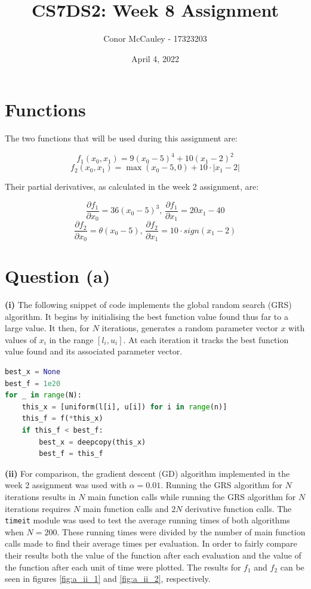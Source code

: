 \documentclass[12pt]{article}
\title{CS7DS2: Week 8 Assignment}
\author{Conor McCauley - 17323203}
\date{April 4, 2022}
\begin{document}
\maketitle

\section*{Functions}

The two functions that will be used during this assignment are:

$$f_1(x_0, x_1) = 9 (x_0 - 5)^4 + 10 (x_1 - 2)^2$$
$$f_2(x_0, x_1) = \max(x_0 - 5, 0) + 10 \cdot |x_1 - 2|$$

Their partial derivatives, as calculated in the week 2 assignment, are:

$$\frac{\partial f_1}{\partial x_0} = 36 (x_0 - 5)^3,\, \frac{\partial f_1}{\partial x_1} = 20x_1 - 40$$
$$\frac{\partial f_2}{\partial x_0} = \theta(x_0 - 5),\, \frac{\partial f_2}{\partial x_1} = 10\cdot sign(x_1 - 2)$$

\section*{Question (a)}

\noindent \textbf{(i)} The following snippet of code implements the global random search (GRS) algorithm. It begins by initialising the best function value found thus far to a large value. It then, for $N$ iterations, generates a random parameter vector $x$ with values of $x_i$ in the range $[l_i, u_i]$. At each iteration it tracks the best function value found and its associated parameter vector.

\lstset{basicstyle=\footnotesize}
\begin{lstlisting}[language=Python]
best_x = None
best_f = 1e20
for _ in range(N):
    this_x = [uniform(l[i], u[i]) for i in range(n)]
    this_f = f(*this_x)
    if this_f < best_f:
        best_x = deepcopy(this_x)
        best_f = this_f
\end{lstlisting}

\noindent \textbf{(ii)} For comparison, the gradient descent (GD) algorithm implemented in the week 2 assignment was used with $\alpha=0.01$. Running the GRS algorithm for $N$ iterations results in $N$ main function calls while running the GRS algorithm for $N$ iterations requires $N$ main function calls and $2N$ derivative function calls. The \texttt{timeit} module was used to test the average running times of both algorithms when $N = 200$. These running times were divided by the number of main function calls made to find their average times per evaluation. In order to fairly compare their results both the value of the function after each evaluation and the value of the function after each unit of time were plotted. The results for $f_1$ and $f_2$ can be seen in figures \ref{fig:a_ii_1} and \ref{fig:a_ii_2}, respectively.
\end{document}
